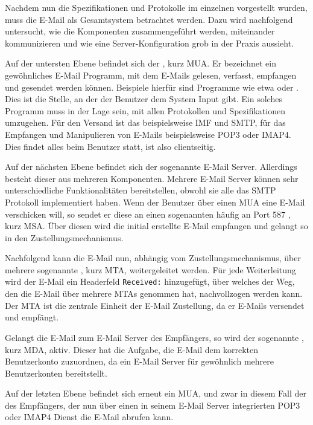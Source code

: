 Nachdem nun die Spezifikationen und Protokolle im einzelnen vorgestellt wurden, muss die E-Mail als Gesamtsystem betrachtet werden. Dazu wird nachfolgend untersucht, wie die Komponenten zusammengeführt werden, miteinander kommunizieren und wie eine Server-Konfiguration grob in der Praxis aussieht.

Auf der untersten Ebene befindet sich der , kurz MUA. Er bezeichnet ein gewöhnliches E-Mail Programm, mit dem E-Mails gelesen, verfasst, empfangen und gesendet werden können. Beispiele hierfür sind Programme wie etwa 
oder .
Dies ist die Stelle, an der der Benutzer dem System Input gibt. Ein solches Programm muss in der Lage sein, mit allen Protokollen und Spezifikationen umzugehen. Für den Versand ist das beispielsweise IMF und SMTP, für das Empfangen und Manipulieren von E-Mails beispielsweise POP3 oder IMAP4.
Dies findet alles beim Benutzer statt, ist also clientseitig.

Auf der nächsten Ebene befindet sich der sogenannte E-Mail Server. Allerdings besteht dieser aus mehreren Komponenten. Mehrere E-Mail Server können sehr unterschiedliche Funktionalitäten bereitstellen, obwohl sie alle das SMTP Protokoll implementiert haben. Wenn der Benutzer über einen MUA eine E-Mail verschicken will, so sendet er diese an einen sogenannten  häufig an Port 587 , kurz MSA. Über diesen wird die initial erstellte E-Mail empfangen und gelangt so in den Zustellungsmechanismus.

Nachfolgend kann die E-Mail nun, abhängig vom Zustellungsmechanismus, über mehrere sogenannte , kurz MTA, weitergeleitet werden. Für jede Weiterleitung wird der E-Mail ein Headerfeld \verb#Received:# hinzugefügt, über welches der Weg, den die E-Mail über mehrere MTAs genommen hat, nachvollzogen werden kann. Der MTA ist die zentrale Einheit der E-Mail Zustellung, da er E-Mails versendet und empfängt.

Gelangt die E-Mail zum E-Mail Server des Empfängers, so wird der sogenannte , kurz MDA, aktiv. Dieser hat die Aufgabe, die E-Mail dem korrekten Benutzerkonto zuzuordnen, da ein E-Mail Server für gewöhnlich mehrere Benutzerkonten bereitstellt.

Auf der letzten Ebene befindet sich erneut ein MUA, und zwar in diesem Fall der des Empfängers, der nun über einen in seinem E-Mail Server integrierten POP3 oder IMAP4 Dienst die E-Mail abrufen kann.

